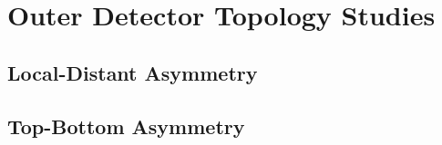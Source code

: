 \chapter{Outer Detector Topology Studies}
\label{chpt:OD_Topology}
\section{Local-Distant Asymmetry}

\section{Top-Bottom Asymmetry}